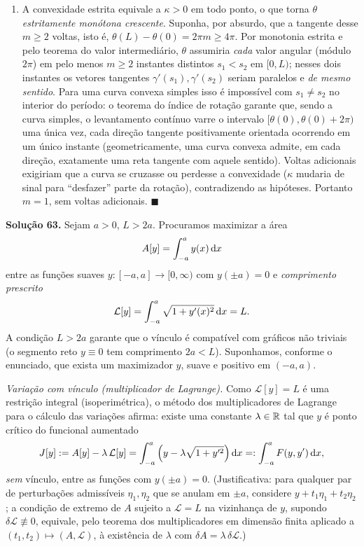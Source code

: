 \begin{enumerate}[label=(\alph*)]
\item A convexidade estrita equivale a $\kappa>0$ em todo ponto, o que torna $\theta$ \emph{estritamente monótona crescente}. Suponha, por absurdo, que a tangente desse $m\ge2$ voltas, isto é, $\theta(L)-\theta(0)=2\pi m\ge4\pi$. Por monotonia estrita e pelo teorema do valor intermediário, $\theta$ assumiria \emph{cada} valor angular (módulo $2\pi$) em pelo menos $m\ge2$ instantes distintos $s_1<s_2$ em $[0,L)$; nesses dois instantes os vetores tangentes $\gamma'(s_1),\gamma'(s_2)$ seriam paralelos e \emph{de mesmo sentido}. Para uma curva convexa simples isso é impossível com $s_1\neq s_2$ no interior do período: o teorema do índice de rotação garante que, sendo a curva simples, o levantamento contínuo varre o intervalo $[\theta(0),\theta(0)+2\pi)$ uma única vez, cada direção tangente positivamente orientada ocorrendo em um único instante (geometricamente, uma curva convexa admite, em cada direção, exatamente uma reta tangente com aquele sentido). Voltas adicionais exigiriam que a curva se cruzasse ou perdesse a convexidade ($\kappa$ mudaria de sinal para ``desfazer'' parte da rotação), contradizendo as hipóteses. Portanto $m=1$, sem voltas adicionais. \qquad$\blacksquare$

\end{enumerate}


\bigskip\noindent\textbf{Solução 63.}\quad
Sejam $a>0$, $L>2a$. Procuramos maximizar a área
\[
A[y]=\int_{-a}^a y(x)\,\mathrm{d} x
\]
entre as funções suaves $y:[-a,a]\to[0,\infty)$ com $y(\pm a)=0$ e \emph{comprimento prescrito}
\[
\mathcal L[y]=\int_{-a}^a\sqrt{1+y'(x)^2}\,\mathrm{d} x=L.
\]
A condição $L>2a$ garante que o vínculo é compatível com gráficos não triviais (o segmento reto $y\equiv0$ tem comprimento $2a<L$). Suponhamos, conforme o enunciado, que exista um maximizador $y$, suave e positivo em $(-a,a)$.

\medskip
\noindent\emph{Variação com vínculo (multiplicador de Lagrange).}
Como $\mathcal L[y]=L$ é uma restrição integral (isoperimétrica), o método dos multiplicadores de Lagrange para o cálculo das variações afirma: existe uma constante $\lambda\in\mathbb{R}$ tal que $y$ é ponto crítico do funcional aumentado
\[
J[y]:=A[y]-\lambda\,\mathcal L[y]=\int_{-a}^a\Big(y-\lambda\sqrt{1+y'^2}\Big)\,\mathrm{d} x=:\int_{-a}^a F(y,y')\,\mathrm{d} x,
\]
\emph{sem} vínculo, entre as funções com $y(\pm a)=0$. (Justificativa: para qualquer par de perturbações admissíveis $\eta_1,\eta_2$ que se anulam em $\pm a$, considere $y+t_1\eta_1+t_2\eta_2$; a condição de extremo de $A$ sujeito a $\mathcal L=L$ na vizinhança de $y$, supondo $\delta\mathcal L\not\equiv0$, equivale, pelo teorema dos multiplicadores em dimensão finita aplicado a $(t_1,t_2)\mapsto(A,\mathcal L)$, à existência de $\lambda$ com $\delta A=\lambda\,\delta\mathcal L$.)

